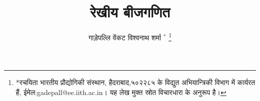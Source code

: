 \documentclass[journal,12pt,twocolumn]{IEEEtran}
\renewcommand\thesection{\arabic{section}}
\begin{document}
\let\StandardTheFigure\thefigure
\let\vec\mathbf
\renewcommand{\thefigure}{\thesection}



\def\putbox#1#2#3{\makebox[0in][l]{\makebox[#1][l]{}\raisebox{\baselineskip}[0in][0in]{\raisebox{#2}[0in][0in]{#3}}}}
     \def\rightbox#1{\makebox[0in][r]{#1}}
     \def\centbox#1{\makebox[0in]{#1}}
     \def\topbox#1{\raisebox{-\baselineskip}[0in][0in]{#1}}
     \def\midbox#1{\raisebox{-0.5\baselineskip}[0in][0in]{#1}}

\vspace{3cm}

\title{
रेखीय बीजगणित
}
\author{ गाड़ेपल्लि वेंकट विश्वनाथ शर्मा $^{*}$%
	\thanks{*रचयिता भारतीय प्रौद्योगिकी संस्थान, हैदराबाद,५०२२८५ के विद्युत अभियान्त्रिकी विभाग में कार्यरत हैं, ईमेल:gadepall@ee.iith.ac.in। यह लेख मुक्त स्रोत विचारधारा के अनुरूप  है।}
	
}	


%
%
%

% 
%
\end{document}
